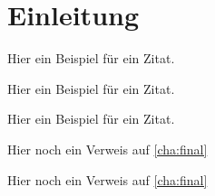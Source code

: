 \chapter*{Einleitung}
\label{cha:einleitung}
Hier ein Beispiel f\"ur ein Zitat. \autocite[8\psq]{bookEvOpt} %

Hier ein Beispiel f\"ur ein Zitat. \autocite[8\psqq]{bookEvOpt} %

Hier ein Beispiel f\"ur ein Zitat. \autocite[8]{bookEvOpt} %

Hier noch ein Verweis auf \cref{cha:final} %

Hier noch ein Verweis auf \vref{cha:final} %